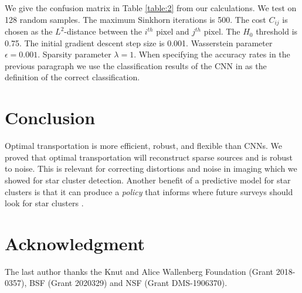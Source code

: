 \documentclass[conference]{IEEEtran}
\begin{document}
We give the confusion matrix in Table \ref{table:2} from our calculations. We test on 128 random samples. The maximum Sinkhorn iterations is 500. The cost $C_{ij}$ is chosen as the $L^2$-distance between the $i^{th}$ pixel and $j^{th}$ pixel. The $H_0$ threshold is 0.75. The initial gradient descent step size is 0.001. Wasserstein parameter $\epsilon=0.001$. Sparsity parameter $\lambda=1$. When specifying the accuracy rates in the previous paragraph we use the classification results of the CNN in \cite{perez} as the definition of the correct classification. 

\section{Conclusion}

Optimal transportation is more efficient, robust, and flexible than CNNs. We proved that optimal transportation will reconstruct sparse sources and is robust to noise. This is relevant for correcting distortions and noise in imaging which we showed for star cluster detection. Another benefit of a predictive model for star clusters is that it can produce a \emph{policy} that informs where future surveys should look for star clusters \cite{rawson, freeman}. 

\section*{Acknowledgment}
The last author thanks the Knut and Alice Wallenberg Foundation (Grant 2018-0357), BSF (Grant 2020329) and NSF (Grant DMS-1906370).
\end{document}

